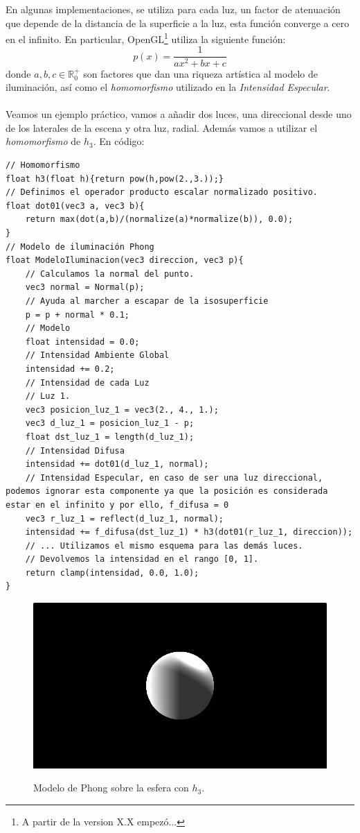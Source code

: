 En algunas implementaciones, se utiliza para cada luz, un factor de atenuación que depende de la distancia de la superficie a la luz, esta función converge a cero en el infinito. En particular, OpenGL\footnote{A partir de la version X.X empezó...} utiliza la siguiente función:
\[p(x)=\dfrac{1}{ax^2+bx+c}\]
donde \(a,b,c \in \mathbb{R}^{+}_{0}\) son factores que dan una riqueza artística al modelo de iluminación, así como el \textit{homomorfismo} utilizado en la \textit{Intensidad Especular}.\\\\
Veamos un ejemplo práctico, vamos a añadir dos luces, una direccional desde uno de los laterales de la escena y otra luz, radial. Además vamos a utilizar el \textit{homomorfismo} de \(h_3\). En código:
\begin{lstlisting}
// Homomorfismo
float h3(float h){return pow(h,pow(2.,3.));}
// Definimos el operador producto escalar normalizado positivo.
float dot01(vec3 a, vec3 b){ 
    return max(dot(a,b)/(normalize(a)*normalize(b)), 0.0);
}
// Modelo de iluminación Phong
float ModeloIluminacion(vec3 direccion, vec3 p){
    // Calculamos la normal del punto.
    vec3 normal = Normal(p);
    // Ayuda al marcher a escapar de la isosuperficie
    p = p + normal * 0.1;
    // Modelo
    float intensidad = 0.0;
    // Intensidad Ambiente Global
    intensidad += 0.2;
    // Intensidad de cada Luz
    // Luz 1.
    vec3 posicion_luz_1 = vec3(2., 4., 1.);
    vec3 d_luz_1 = posicion_luz_1 - p;
    float dst_luz_1 = length(d_luz_1);
    // Intensidad Difusa
    intensidad += dot01(d_luz_1, normal);
    // Intensidad Especular, en caso de ser una luz direccional, podemos ignorar esta componente ya que la posición es considerada estar en el infinito y por ello, f_difusa = 0
    vec3 r_luz_1 = reflect(d_luz_1, normal);
    intensidad += f_difusa(dst_luz_1) * h3(dot01(r_luz_1, direccion));
    // ... Utilizamos el mismo esquema para las demás luces.
    // Devolvemos la intensidad en el rango [0, 1].
    return clamp(intensidad, 0.0, 1.0);
}
\end{lstlisting}
\begin{figure}[H]
  \centering
  \captionsetup{justification=centering}%
  \includegraphics[width=1.0\textwidth]{secciones/imagenes/lightmodel/phong.png}\label{fig:phong}
  \caption{Modelo de Phong sobre la esfera con \(h_3\).}
\end{figure}
\newpage
